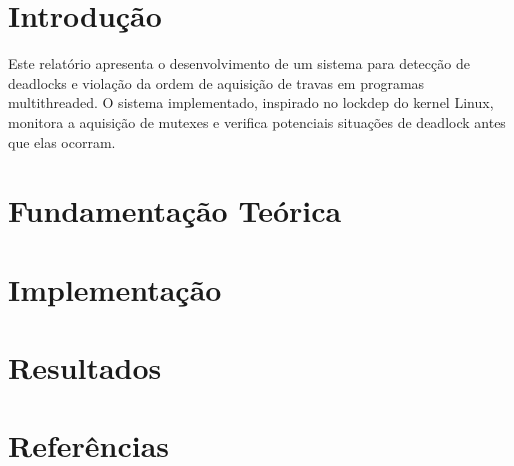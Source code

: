 \documentclass[a4paper,12pt]{report}
\begin{document}







\chapter{Introdução}\label{chap:intro}

Este relatório apresenta o desenvolvimento de um sistema para detecção de deadlocks e violação da ordem de aquisição de travas em programas multithreaded. O sistema implementado, inspirado no lockdep do kernel Linux, monitora a aquisição de mutexes e verifica potenciais situações de deadlock antes que elas ocorram.





\chapter{Fundamentação Teórica}\label{chap:fundamentacao}





\chapter{Implementação}\label{chap:impl}






\chapter{Resultados}\label{chap:results}





\chapter{Referências}\label{chap:refs}


\nocite{*}




\appendix

\end{document}
